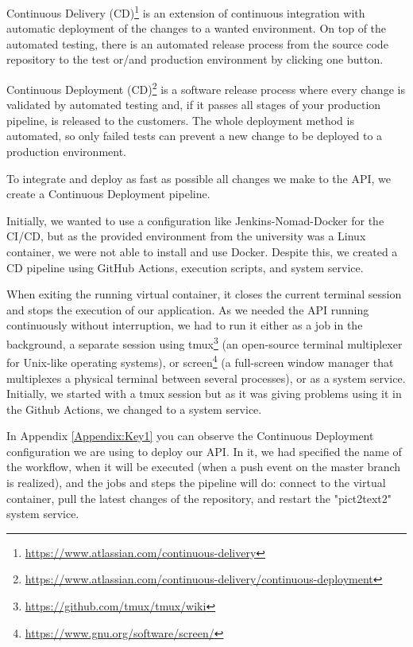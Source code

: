 Continuous Delivery (CD)\footnote{\href{https://www.atlassian.com/continuous-delivery}{https://www.atlassian.com/continuous-delivery}} is an extension of continuous integration with automatic deployment of the changes to a wanted environment. On top of the automated testing, there is an automated release process from the source code repository to the test or/and production environment by clicking one button.

Continuous Deployment (CD)\footnote{\href{https://www.atlassian.com/continuous-delivery/continuous-deployment}{https://www.atlassian.com/continuous-delivery/continuous-deployment}} is a software release process where every change is validated by automated testing and, if it passes all stages of your production pipeline, is released to the customers. The whole deployment method is automated, so only failed tests can prevent a new change to be deployed to a production environment.

To integrate and deploy as fast as possible all changes we make to the API, we create a Continuous Deployment pipeline.

Initially, we wanted to use a configuration like Jenkins-Nomad-Docker for the CI/CD, but as the provided environment from the university was a Linux container, we were not able to install and use Docker. Despite this, we created a CD pipeline using GitHub Actions, execution scripts, and system service.

When exiting the running virtual container, it closes the current terminal session and stops the execution of our application. As we needed the API running continuously without interruption, we had to run it either as a job in the background, a separate session using tmux\footnote{\href{https://github.com/tmux/tmux/wiki}{https://github.com/tmux/tmux/wiki}} (an open-source terminal multiplexer for Unix-like operating systems), or screen\footnote{\href{https://www.gnu.org/software/screen/}{https://www.gnu.org/software/screen/}} (a full-screen window manager that multiplexes a physical terminal between several processes), or as a system service. Initially, we started with a tmux session but as it was giving problems using it in the Github Actions, we changed to a system service.

In Appendix \ref{Appendix:Key1} you can observe the Continuous Deployment configuration we are using to deploy our API. In it, we had specified the name of the workflow, when it will be executed (when a push event on the master branch is realized), and the jobs and steps the pipeline will do: connect to the virtual container, pull the latest changes of the repository, and restart the "pict2text2" system service.

